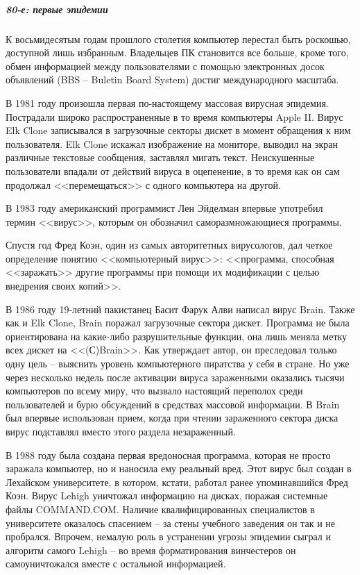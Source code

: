 \subparagraph{80-е: первые эпидемии}
%
К восьмидесятым годам прошлого столетия компьютер перестал быть роскошью,
доступной лишь избранным. Владельцев ПК становится все больше, кроме того,
обмен информацией между пользователями с помощью электронных досок объявлений
(BBS – Buletin Board System) достиг международного масштаба.

В 1981 году произошла первая по-настоящему массовая вирусная эпидемия.
Пострадали широко распространенные в то время компьютеры Apple II. Вирус Elk
Clone записывался в загрузочные секторы дискет в момент обращения к ним
пользователя. Elk Clone искажал изображение на мониторе, выводил на экран
различные текстовые сообщения, заставлял мигать текст. Неискушенные
пользователи впадали от действий вируса в оцепенение, в то время как он сам
продолжал <<перемещаться>> с одного компьютера на другой.

В 1983 году американский программист Лен Эйделман впервые употребил термин
<<вирус>>, которым он обозначил саморазмножающиеся программы.

Спустя год Фред Коэн, один из самых авторитетных вирусологов, дал четкое
определение понятию <<компьютерный вирус>>: <<программа, способная
<<заражать>> другие программы при помощи их модификации с целью внедрения
своих копий>>.

В 1986 году 19-летний пакистанец Басит Фарук Алви написал вирус Brain. Также
как и Elk Clone, Brain поражал загрузочные сектора дискет. Программа не была
ориентирована на какие-либо разрушительные функции, она лишь меняла метку
всех дискет на <<(С)Brain>>. Как утверждает автор, он преследовал только одну
цель – выяснить уровень компьютерного пиратства у себя в стране. Но уже через
несколько недель после активации вируса зараженными оказались тысячи
компьютеров по всему миру, что вызвало настоящий переполох среди
пользователей и бурю обсуждений в средствах массовой информации. В Brain был
впервые использован прием, когда при чтении зараженного сектора диска вирус
подставлял вместо этого раздела незараженный.

В 1988 году была создана первая вредоносная программа, которая не просто
заражала компьютер, но и наносила ему реальный вред. Этот вирус был создан в
Лехайском университете, в котором, кстати, работал ранее упоминавшийся Фред
Коэн. Вирус Lehigh уничтожал информацию на дисках, поражая системные файлы
COMMAND.COM. Наличие квалифицированных специалистов в университете оказалось
спасением – за стены учебного заведения он так и не пробрался. Впрочем,
немалую роль в устранении угрозы эпидемии сыграл и алгоритм самого Lehigh –
во время форматирования винчестеров он самоуничтожался вместе с остальной
информацией.

